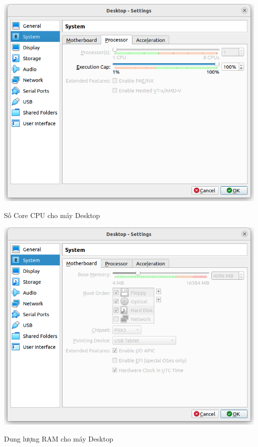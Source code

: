\documentclass[a4paper, 11pt]{article}
\begin{document}
\begin{itemize}
\begin{enumerate}
                    \begin{minipage}
                        {\linewidth}
                        \captionsetup{type=figure}
                        \centering
                        \includegraphics[width=\linewidth]{images/desktop-processor.png}
                        \caption{Số Core CPU cho máy Desktop}
                        \label{figure:desktop-processor}
                    \end{minipage}

                    \begin{minipage}
                        {\linewidth}
                        \captionsetup{type=figure}
                        \centering
                        \includegraphics[width=\linewidth]{images/desktop-ram.png}
                        \caption{Dung lượng RAM cho máy Desktop}
                        \label{figure:desktop-ram}
                    \end{minipage}


\end{enumerate}
\end{itemize}
\end{document}
